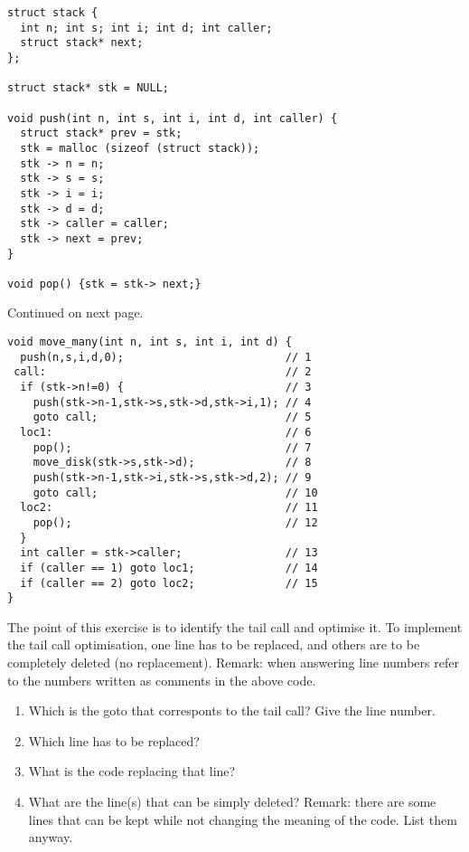 \documentclass{article}
\begin{document}
\begin{verbatim}
struct stack {
  int n; int s; int i; int d; int caller;
  struct stack* next;
};

struct stack* stk = NULL;

void push(int n, int s, int i, int d, int caller) {
  struct stack* prev = stk;
  stk = malloc (sizeof (struct stack));
  stk -> n = n;
  stk -> s = s;
  stk -> i = i;
  stk -> d = d;
  stk -> caller = caller;
  stk -> next = prev;
}

void pop() {stk = stk-> next;}

\end{verbatim}
Continued on next page.
\newpage
\begin{verbatim}
void move_many(int n, int s, int i, int d) {
  push(n,s,i,d,0);                         // 1
 call:                                     // 2
  if (stk->n!=0) {                         // 3
    push(stk->n-1,stk->s,stk->d,stk->i,1); // 4
    goto call;                             // 5
  loc1:                                    // 6
    pop();                                 // 7
    move_disk(stk->s,stk->d);              // 8
    push(stk->n-1,stk->i,stk->s,stk->d,2); // 9
    goto call;                             // 10
  loc2:                                    // 11
    pop();                                 // 12
  }
  int caller = stk->caller;                // 13
  if (caller == 1) goto loc1;              // 14
  if (caller == 2) goto loc2;              // 15
}
\end{verbatim}

The point of this exercise is to identify the tail call and optimise
it. To implement the tail call optimisation, one line has to be
replaced, and others are to be completely deleted (no replacement).
Remark: when answering line numbers refer to the numbers written as
comments in the above code.

\begin{enumerate}
\item Which is the goto that corresponts to the tail call? Give the
  line number.

\item Which line has to be replaced? 
\item What is the code replacing that line? 
\item What are the line(s) that can be simply deleted? Remark: there
  are some lines that can be kept while not changing the meaning of
  the code. List them anyway.  
\end{enumerate}
\end{document}
